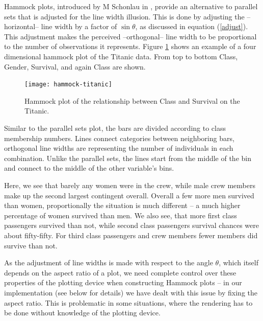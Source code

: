 Hammock plots, introduced by M Schonlau in \citep{schonlau:2003}, provide an alternative to parallel sets that is adjusted for the line width illusion. This is done by  adjusting the --horizontal-- line width by  a factor of $\sin \theta$, as discussed in equation (\ref{adjust}). This adjustment makes the perceived --orthogonal-- line width to be proportional to the number of observations it represents. 
 Figure \ref{hammock} shows an example of a four dimensional hammock plot of the Titanic data. From top to bottom Class, Gender, Survival, and again Class are shown. 
\begin{figure}
\centering
\texttt{[image: hammock-titanic]}
\caption{\label{hammock} Hammock plot of the relationship between Class and Survival on the Titanic. }
\end{figure}

Similar to the parallel sets plot, the bars are divided according to class membership numbers.  Lines connect categories between neighboring bars, orthogonal line widths are representing the number of individuals in each combination. Unlike the parallel sets, the lines start from the middle of the bin and connect to the middle of the other variable's bins. 

Here, we see that barely any women were in the crew, while male crew members make up the second largest contingent overall. Overall a few more men survived than women, proportionally the situation is much different -- a much higher percentage of women survived than men. We also see, that more first class passengers survived than not, while second class passengers survival chances were about fifty-fifty. For third class passengers and crew members fewer members did  survive than not. 

As the adjustment of line widths is made with respect to the angle $\theta$, which itself depends on the aspect ratio of a plot, we need complete control over these properties of the plotting device when constructing Hammock plots  -- in our implementation (see below for details) we have dealt with this issue by fixing the aspect ratio. This is problematic in some situations, where the rendering has to be done without knowledge of the plotting device. 

